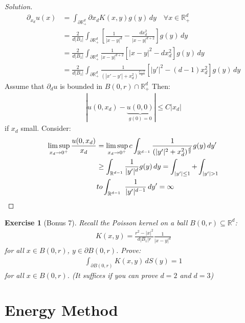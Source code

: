 \documentclass{report}
\theoremstyle{tommy}
\newtheorem{ex}[defn]{Exercise}
\begin{document}
  \begin{proof}[Solution]
    \begin{align*}
      \partial_{x_d} u(x) &= \int_{\partial \mathbb{R}_+^d} \partial x_d K(x,y) g(y) \, dy \quad \forall x \in \mathbb{R}_+^d \\
      &= \frac{2}{d |B_1|} \int_{\partial \mathbb{R}_+^d} \left[\frac{1}{|x-y|^d} - \frac{dx_d^2}{|x-y|^{d+2}}\right] g(y) \, dy \\
      &= \frac{2}{d |B_1|} \int_{\partial \mathbb{R}_+^d} \frac{1}{|x-y|^{d+2}} [|x-y|^2 - dx_d^2] g(y) \, dy \\
      &= \frac{2}{d|B_1|} \int_{\partial \mathbb{R}_+^d} \frac{1}{(|x'-y'|+x_d^2)^{\frac{d+2}{2}}} \left[|y'|^2 - (d-1) x_d^2\right] g(y) \, dy
    \end{align*}
    Assume that \(\partial_d u\) is bounded in \(B(0,r) \cap \mathbb{R}_+^d\) Then:
    \begin{align*}
      |u(0,x_d) - \underbrace{u(0,0)}_{g(0) = 0}| \le C |x_d|
    \end{align*}
    if \(x_d\) small. Consider:
    \begin{align*}
      \limsup_{x_d \to 0^+} \frac{u(0,x_d)}{x_d} 
      &= \limsup_{x_d \to 0^+} c \int_{\mathbb{R}^{d-1}} \frac{1}{(|y'|^2 + x_d^2)^{\frac{d}{2}}} g(y) \, dy' \\
      &\ge \int_{\mathbb{R}^{d-1}} \frac{1}{|y'|^d} g(y) \, dy 
      = \int_{|y'| \le 1} + \int_{|y'| > 1} \\
      &to \int_{\mathbb{R}^{d-1}} \frac{1}{|y'|^{d-1}} \, dy' = \infty \qedhere
    \end{align*}
  \end{proof}

  \begin{ex}[Bonus 7]
    Recall the Poisson kernel on a ball \(B(0,r) \subseteq \mathbb{R}^d\):
    \begin{align*}
      K(x,y) = \frac{r^2 - |x|^2}{d|B_1|r} \frac{1}{|x-y|^d}
    \end{align*}
    for all \(x \in B(0,r)\), \(y \in \partial B(0,r)\). Prove:
    \begin{align*}
      \int_{\partial B(0,r)} K(x,y) \, dS(y) = 1
    \end{align*}
    for all \(x \in B(0,r)\). (It suffices if you can prove \(d = 2\) and \(d = 3\))
  \end{ex}

  \section{Energy Method}
\end{document}
